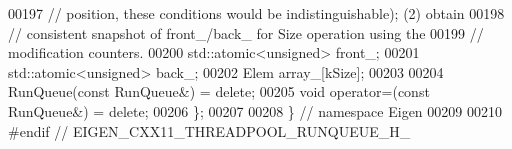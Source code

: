 \begin{DoxyCode}
00197   \textcolor{comment}{// position, these conditions would be indistinguishable); (2) obtain}
00198   \textcolor{comment}{// consistent snapshot of front\_/back\_ for Size operation using the}
00199   \textcolor{comment}{// modification counters.}
00200   std::atomic<unsigned> front\_;
00201   std::atomic<unsigned> back\_;
00202   Elem array\_[kSize];
00203 
00204   RunQueue(\textcolor{keyword}{const} RunQueue&) = \textcolor{keyword}{delete};
00205   \textcolor{keywordtype}{void} operator=(\textcolor{keyword}{const} RunQueue&) = \textcolor{keyword}{delete};
00206 \};
00207 
00208 \}  \textcolor{comment}{// namespace Eigen}
00209 
00210 \textcolor{preprocessor}{#endif  // EIGEN\_CXX11\_THREADPOOL\_RUNQUEUE\_H\_}
\end{DoxyCode}
